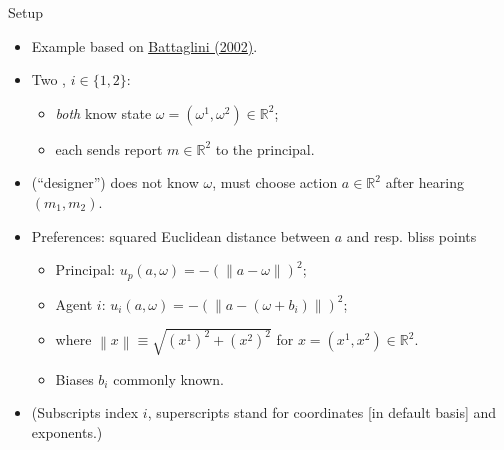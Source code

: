 \documentclass[english,10pt
,aspectratio=169
]{beamer}
\begin{document}
\begin{frame}{Setup}
	\begin{itemize}
		\item Example based on \href{https://onlinelibrary.wiley.com/doi/abs/10.1111/1468-0262.00336}{\uline{Battaglini (2002)}}.
		\item Two , $i \in \{1,2\}$:
		\begin{itemize}
			\item \emph{both} know \alert{state} $\omega = (\omega^1,\omega^2) \in \mathbb{R}^2$;
			\item each sends \alert{report} $m \in \mathbb{R}^2$ to the principal.
		\end{itemize}
		\item {} (``designer'') does not know $\omega$, must choose action $a \in \mathbb{R}^2$ \alert{after} hearing $(m_1,m_2)$.
		\item Preferences: squared Euclidean distance between $a$ and resp. \alert{bliss points}
		\begin{itemize}
			\item Principal: $u_p (a,\omega) = -\left(\left\|a-\omega\right\| \right)^2$;
			\item Agent $i$: $u_i (a,\omega) = -\left(\left\|a-(\omega+b_i)\right\| \right)^2$;
			\item where $\left\|x\right\| \equiv \sqrt{(x^1)^2 + (x^2)^2}$ for $x = (x^1,x^2) \in \mathbb{R}^2$.
			\item \alert{Biases} $b_i$ commonly known.
		\end{itemize}
		\item (Subscripts index $i$, superscripts stand for coordinates [in default basis] and exponents.)
	\end{itemize}
\end{frame}
\end{document}
